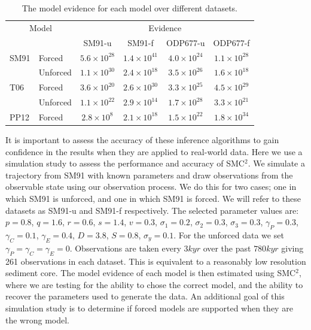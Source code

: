 \documentclass[a4paper,12pt]{article}
\begin{document}
\begin{table}[t]
\begin{center}
\begin{tabular}{| l l | c c | c c |}

\hline
\multicolumn{2}{|c|}{Model} & \multicolumn{4}{|c|}{Evidence} \\
\cline{3-6}
& & SM91-u & SM91-f & ODP677-u & ODP677-f\\
\hline
SM91 & Forced & $5.6 \times 10^{28}$ & $1.4 \times 10^{41}$ & $4.0 \times 10^{24}$ & $1.1 \times 10^{28}$ \\
 & Unforced & $1.1 \times 10^{30}$ & $2.4 \times 10^{18}$ & $3.5 \times 10^{26}$ & $1.6 \times 10^{18}$ \\
T06 & Forced & $3.6 \times 10^{20}$ & $2.6 \times 10^{30}$ & $3.3 \times 10^{25}$ & $4.5 \times 10^{29}$  \\
 & Unforced & $1.1 \times 10^{22}$ & $2.9 \times 10^{14}$ & $1.7 \times 10^{28}$ & $3.3 \times 10^{21}$  \\ 
PP12 & Forced & $2.8 \times 10^{8}$ & $2.1 \times 10^{18}$ & $1.5 \times 10^{22}$ & $1.8 \times 10^{34}$  \\
\hline
\end{tabular}
\caption{The model evidence for each model over different datasets.}
\label{Tab:Evidence}
\end{center}
\end{table}

\noindent It is important to assess the accuracy of these inference algorithms to gain confidence in the results when they are applied to real-world data.
Here we use a simulation study to assess the performance and accuracy of SMC$^2$.
We simulate a trajectory from SM91 with known parameters and draw observations from the observable state using our observation process.
We do this for two cases; one in which SM91 is unforced, and one in which SM91 is forced.
We will refer to these datasets as SM91-u and SM91-f respectively.
The selected parameter values are: $p=0.8$, $q=1.6$, $r=0.6$, $s=1.4$, $v=0.3$, $\sigma_1=0.2$, $\sigma_2=0.3$, $\sigma_3=0.3$, $\gamma_P=0.3$, $\gamma_C=0.1$, $\gamma_E=0.4$, $D=3.8$, $S=0.8$, $\sigma_y=0.1$.
For the unforced data we set $\gamma_P = \gamma_C = \gamma_E = 0$.
Observations are taken every $3kyr$ over the past $780kyr$ giving 261 observations in each dataset.
This is equivalent to a reasonably low resolution sediment core.
The model evidence of each model is then estimated using SMC$^2$, where we are testing for the ability to chose the correct model, and the ability to recover the parameters used to generate the data.
An additional goal of this simulation study is to determine if forced models are supported when they are the wrong model.
\end{document}
